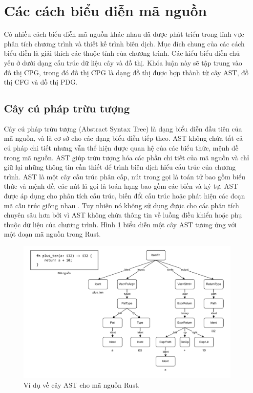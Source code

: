 \section{Các cách biểu diễn mã nguồn}

Có nhiều cách biểu diễn mã nguồn khác nhau đã được phát triển trong lĩnh vực phân tích chương trình và thiết kế trình biên dịch.
Mục đích chung của các cách biểu diễn là giải thích các thuộc tính của chương trình.
Các kiểu biểu diễn chủ yếu ở dưới dạng cấu trúc dữ liệu cây và đồ thị.
Khóa luận này sẽ tập trung vào đồ thị CPG, trong đó đồ thị CPG là dạng đồ thị được hợp thành từ cây AST, đồ thị CFG và đồ thị PDG.

\subsection{Cây cú pháp trừu tượng}

Cây cú pháp trừu tượng (Abstract Syntax Tree) \cite{zhang2019novel} là dạng biểu diễn đầu tiên của mã nguồn, và là cơ sở cho các dạng biểu diễn tiếp theo.
AST không chứa tất cả cú pháp chi tiết nhưng vẫn thể hiện được quan hệ của các biểu thức, mệnh đề trong mã nguồn.
AST giúp trừu tượng hóa các phần chi tiết của mã nguồn và chỉ giữ lại những thông tin cần thiết để trình biên dịch hiểu cấu trúc của chương trình.
AST là một cây cấu trúc phân cấp, nút trong gọi là toán tử bao gồm biểu thức và mệnh đề, các nút lá gọi là toán hạng bao gồm các biến và ký tự.
AST được áp dụng cho phân tích cấu trúc, biến đổi cấu trúc hoặc phát hiện các đoạn mã cấu trúc giống nhau \cite{yamaguchi2012generalized}.
Tuy nhiên nó không sử dụng được cho các phân tích chuyên sâu hơn bởi vì AST không chứa thông tin về luồng điều khiển hoặc phụ thuộc dữ liệu của chương trình.
Hình \ref{img:c2_ast} biểu diễn một cây AST tương ứng với một đoạn mã nguồn trong Rust.

\begin{figure}[H]
  \includegraphics[width=1\columnwidth]{figures/c2/c2_ast.drawio.pdf}
  \centering
  \caption{Ví dụ về cây AST cho mã nguồn Rust.}
  \label{img:c2_ast}
\end{figure}


